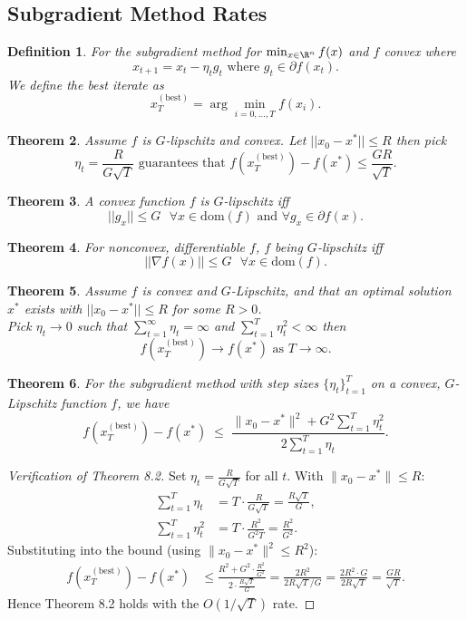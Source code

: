 \documentclass[a4paper]{article}
\newtheorem{thm}{Theorem}[section]
\newtheorem{defn}[thm]{Definition}
\begin{document}
\subsection{Subgradient Method Rates}
\begin{defn}
    For the subgradient method for $\min_{x\in \R^n} f(x)$ and $f$ convex where \[
    x_{t+1}=x_t - \eta_t g_t \text{ where } g_t\in \partial f(x_t)
    .\] 
    We define the best iterate as \[
    x_T^{\mathrm{(best)}}=\arg\min_{i=0,...,T} f(x_i)
    .\] 
\end{defn}
\begin{thm}
    Assume $f$ is $G$-lipschitz and convex. Let $||x_0-x^*||\leq R$ then pick \[
    \eta_t=\frac{R}{G\sqrt{T}} \text{ guarantees that } f\left (x_T^{\mathrm{(best)}}\right )-f(x^*)\leq \frac{GR}{\sqrt{T}} 
    .\] 
\end{thm}
\begin{thm}
    A convex function $f$ is $G$-lipschitz iff \[
    ||g_x||\leq G \text{ }\forall x\in \mathrm{dom}(f) \text{ and } \forall g_x\in \partial f(x)
    .\] 
\end{thm}
\begin{thm}
    For nonconvex, differentiable $f$, $f$ being $G$-lipschitz iff \[
    ||\nabla f(x)||\leq G \text{ }\forall x\in \mathrm{dom}(f)
    .\] 
\end{thm}
\begin{thm}
    Assume $f$ is convex and $G$-Lipschitz, and that an optimal solution $x^*$ exists with $||x_0-x^*||\leq R$ for some $R>0$.\\ 
    Pick $\eta_t\to 0$ such that $\sum_{t=1}^\infty \eta_t =\infty$ and $\sum_{t=1}^T \eta_t^2<\infty$ then \[
    f\left (x_T^{\mathrm{(best)}}\right )\to f(x^*) \text{ as } T\to \infty
    .\] 
\end{thm}
\begin{thm}
    For the subgradient method with step sizes $\{\eta_t\}_{t=1}^T$ on a convex, $G$-Lipschitz function $f$, we have
    \[
        f \left( x_T^{\mathrm{(best)}} \right)-f(x^*)
        \;\leq\;
        \frac{\lVert x_0 - x^* \rVert^2 + G^2 \sum_{t=1}^T \eta_t^2}{2 \sum_{t=1}^T \eta_t}.
    \]
\end{thm}
\begin{proof}[Verification of Theorem 8.2]
    Set $\eta_t = \frac{R}{G\sqrt{T}}$ for all $t$. With $\lVert x_0 - x^* \rVert \leq R$:
    \begin{align*}
        \sum_{t=1}^T \eta_t &= T \cdot \frac{R}{G\sqrt{T}} = \frac{R\sqrt{T}}{G}, \\
        \sum_{t=1}^T \eta_t^2 &= T \cdot \frac{R^2}{G^2 T} = \frac{R^2}{G^2}.
    \end{align*}
    Substituting into the bound (using $\lVert x_0 - x^* \rVert^2 \leq R^2$):
    \begin{align*}
        f \left( x_T^{\mathrm{(best)}} \right) - f(x^*)
        &\leq \frac{R^2 + G^2 \cdot \frac{R^2}{G^2}}{2 \cdot \frac{R\sqrt{T}}{G}}
        = \frac{2R^2}{2R\sqrt{T}/G}
        = \frac{2R^2 \cdot G}{2R\sqrt{T}}
        = \frac{GR}{\sqrt{T}}.
    \end{align*}
    Hence Theorem 8.2 holds with the $O(1/\sqrt{T})$ rate.
\end{proof}
\end{document}
